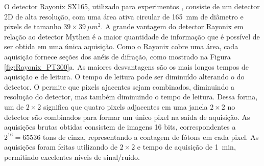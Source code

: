 O detector Rayonix SX165, utilizado para experimentos , consiste de um detector 2D de alta resolução, com uma área ativa circular de \SI{165}{mm} de diâmetro e pixels de tamanho $39 \times \SI{39}{\mu m^2}$. A grande vantagem do detector Rayonix em relação ao detector Mythen é a maior quantidade de informação que é possível de ser obtida em uma única aquisição. Como o Rayonix cobre uma área, cada aquisição fornece seções dos anéis de difração, como mostrado na Figura \ref{fig:Rayonix_PT300}a. As maiores desvantagens são os mais longos tempos de aquisição e de leitura. O tempo de leitura pode ser diminuído alterando o  do detector. O  permite que pixels ajacentes sejam combinados, diminuindo a resolução do detector, mas também diminuindo o tempo de leitura. Dessa forma, um  de $2 \times 2$ significa que quatro pixels adjacentes em uma janela $2 \times 2$ no detector são combinados para formar um único pixel na saída de aquisição. As aquisições brutas obtidas consistem de imagens 16 bits, correspondentes a $2^{16} = 65536$ tons de cinza, representando a contagem de fótons em cada pixel. 
As aquisições  foram feitas utilizando  de $2 \times 2$ e tempo de aquisição de 1~min, permitindo excelentes níveis de sinal/ruído.

